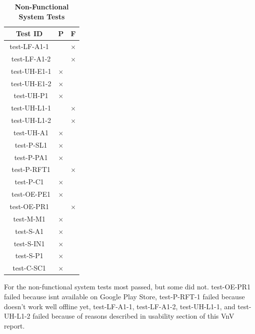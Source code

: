\documentclass[12pt, titlepage]{article}
\begin{document}
\begin{table}[H]
\centering
\begin{tabular}{|c|c|c|}
\hline
Test ID & P & F\\
\hline 
test-LF-A1-1 & & $\times$ \\\
test-LF-A1-2 & & $\times$ \\\
test-UH-E1-1 & $\times$ & \\\
test-UH-E1-2 & $\times$ & \\\
test-UH-P1 & $\times$ & \\\
test-UH-L1-1 & & $\times$ \\\
test-UH-L1-2 & & $\times$ \\\
test-UH-A1 & $\times$ & \\\
test-P-SL1 & $\times$ & \\\
test-P-PA1 & $\times$ & \\\
test-P-RFT1 &  & $\times$ \\
test-P-C1 & $\times$ & \\\
test-OE-PE1 & $\times$ & \\
test-OE-PR1 & & $\times$ \\
test-M-M1 & $\times$ & \\
test-S-A1 & $\times$ & \\
test-S-IN1 & $\times$ & \\
test-S-P1 & $\times$ & \\
test-C-SC1 & $\times$ & \\
\hline
\end{tabular}
\caption{\bf Non-Functional System Tests}
\end{table}

For the non-functional system tests most passed, but some did not. test-OE-PR1 failed because \progname{} isnt available on Google Play Store, test-P-RFT-1 failed because \progname{} doesn't work well offline yet, test-LF-A1-1, test-LF-A1-2, test-UH-L1-1, and test-UH-L1-2 failed because of reasons described in usability section of this VnV report.


		

					
					
\end{document}
